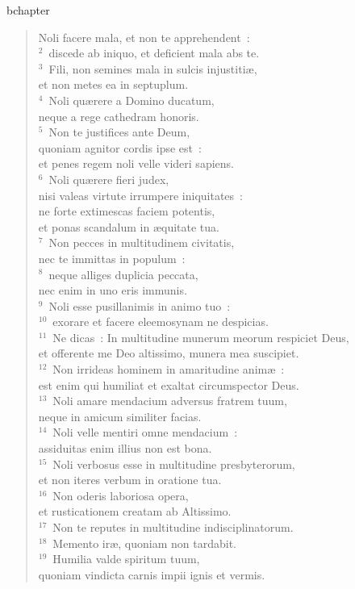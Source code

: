 bchapter\begin{verse}\vspace{-19pt}Noli facere mala, et non te apprehendent~:\\
${}^{2}$~discede ab iniquo, et deficient mala abs te.\\
${}^{3}$~Fili, non semines mala in sulcis injustiti\ae ,\\ et non metes ea in septuplum.\\
${}^{4}$~Noli qu\ae rere a Domino ducatum,\\ neque a rege cathedram honoris.\\
${}^{5}$~Non te justifices ante Deum,\\ quoniam agnitor cordis ipse est~:\\ et penes regem noli velle videri sapiens.\\
${}^{6}$~Noli qu\ae rere fieri judex,\\ nisi valeas virtute irrumpere iniquitates~:\\ ne forte extimescas faciem potentis,\\ et ponas scandalum in \ae quitate tua.\\
${}^{7}$~Non pecces in multitudinem civitatis,\\ nec te immittas in populum~:\\
${}^{8}$~neque alliges duplicia peccata,\\ nec enim in uno eris immunis.\\
${}^{9}$~Noli esse pusillanimis in animo tuo~:\\
${}^{10}$~exorare et facere eleemosynam ne despicias.\\
${}^{11}$~Ne dicas~: In multitudine munerum meorum respiciet Deus,\\ et offerente me Deo altissimo, munera mea suscipiet.\\
${}^{12}$~Non irrideas hominem in amaritudine anim\ae~:\\ est enim qui humiliat et exaltat circumspector Deus.\\
${}^{13}$~Noli amare mendacium adversus fratrem tuum,\\ neque in amicum similiter facias.\\
${}^{14}$~Noli velle mentiri omne mendacium~:\\ assiduitas enim illius non est bona.\\
${}^{15}$~Noli verbosus esse in multitudine presbyterorum,\\ et non iteres verbum in oratione tua.\\
${}^{16}$~Non oderis laboriosa opera,\\ et rusticationem creatam ab Altissimo.\\
${}^{17}$~Non te reputes in multitudine indisciplinatorum.\\
${}^{18}$~Memento ir\ae , quoniam non tardabit.\\
${}^{19}$~Humilia valde spiritum tuum,\\ quoniam vindicta carnis impii ignis et vermis.\end{verse}


